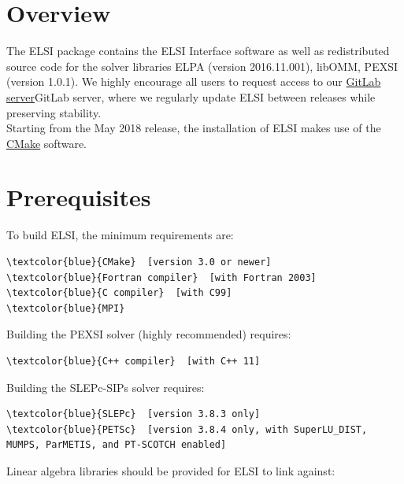 \documentclass{report}
\begin{document}
\section{Overview}
\label{sec:install}
The ELSI package contains the ELSI Interface software as well as redistributed source code for the solver libraries ELPA (version 2016.11.001), libOMM, PEXSI (version 1.0.1).  We highly encourage all users to request access to our \href{http://git.elsi-interchange.org/elsi-devel}{GitLab server}GitLab server, where we regularly update ELSI between releases while preserving stability.\\

Starting from the May 2018 release, the installation of ELSI makes use of the \href{http://cmake.org}{CMake} software.\\

\section{Prerequisites}
\label{sec:prereq}
To build ELSI, the minimum requirements are:\\

\begin{Verbatim}[commandchars=\\\{\}]
\textcolor{blue}{CMake}  [version 3.0 or newer]
\textcolor{blue}{Fortran compiler}  [with Fortran 2003]
\textcolor{blue}{C compiler}  [with C99]
\textcolor{blue}{MPI}
\end{Verbatim}

Building the PEXSI solver (highly recommended) requires:\\

\begin{Verbatim}[commandchars=\\\{\}]
\textcolor{blue}{C++ compiler}  [with C++ 11]
\end{Verbatim}

Building the SLEPc-SIPs solver requires:\\

\begin{Verbatim}[commandchars=\\\{\}]
\textcolor{blue}{SLEPc}  [version 3.8.3 only]
\textcolor{blue}{PETSc}  [version 3.8.4 only, with SuperLU_DIST, MUMPS, ParMETIS, and PT-SCOTCH enabled]
\end{Verbatim}

Linear algebra libraries should be provided for ELSI to link against:\\
\end{document}
